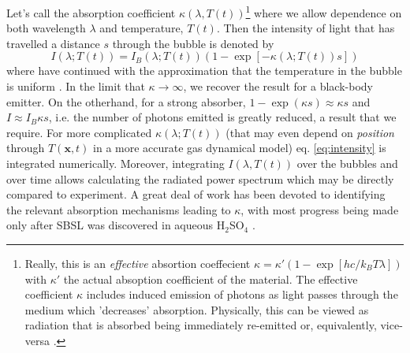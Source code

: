 \documentclass[prb,aps,nofootinbib,superscriptaddress,floatfix]{revtex4-2}
\begin{document}
Let's call the absorption coefficient $\kappa(\lambda,T(t))$\footnote{Really, this is an \emph{effective} absortion coeffecient $\kappa = \kappa'(1-\exp\left[ hc/k_B T \lambda \right])$ with $\kappa'$ the actual absoption coefficient of the material. The effective coefficient $\kappa$ includes induced emission of photons as light passes through the medium which 'decreases' absorption. Physically, this can be viewed as radiation that is absorbed being immediately re-emitted or, equivalently, vice-versa \cite{zel2002physics,taylor1969experimental}.} where we allow dependence on both wavelength $\lambda$ and temperature, $T(t)$. Then the intensity of light that has travelled a distance $s$ through the bubble is denoted by \cite{zel2002physics,hilgenfeldt1999simple}
\begin{equation}
    I(\lambda;T(t))=I_{B}(\lambda;T(t))  \left( 1-\exp \left[ -\kappa(\lambda;T(t)) s \right] \right)
    \label{eq:intensity}
\end{equation}
where have continued with the approximation that the temperature in the bubble is uniform \cite{hilgenfeldt1999sonoluminescence,hilgenfeldt1999simple}. In the limit that $\kappa\rightarrow\infty$, we recover the result for a black-body emitter. On the otherhand, for a strong absorber, $1-\exp(\kappa s)\approx\kappa s$ and $I\approx I_B \kappa s$, i.e. the number of photons emitted is greatly reduced, a result that we require. For more complicated $\kappa(\lambda;T(t))$ (that may even depend on \emph{position} through $T(\bm{x},t)$ in a more accurate gas dynamical model) eq. \ref{eq:intensity} is integrated numerically. Moreover, integrating $I(\lambda,T(t))$ over the bubbles and over time allows calculating the radiated power spectrum which may be directly compared to experiment. A great deal of work has been devoted to identifying the relevant absorption mechanisms leading to $\kappa$, with most progress being made only after SBSL was discovered in aqueous H$_2$SO$_4$ \cite{hilgenfeldt1999simple,brenner2002single,hilgenfeldt1999sonoluminescence,yasui1999mechanism,flannigan2005plasma,flannigan2006measurement,suslick2008inside,an2009diagnosing,an2008spectral,an2006mechanism}. 
\end{document}
